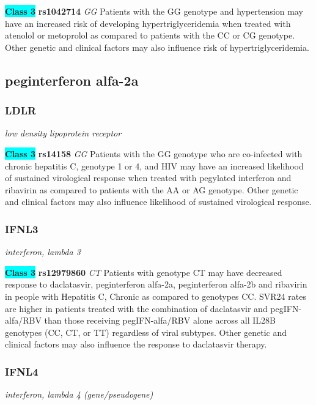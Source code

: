 \documentclass{report}
\begin{document}
\textbf{\colorbox{cyan} {Class 3}} \textbf{ rs1042714 } \textit{ GG }
Patients with the GG genotype and hypertension may have an increased risk of developing hypertriglyceridemia when treated with atenolol or metoprolol as compared to patients with the CC or CG genotype. Other genetic and clinical factors may also influence risk of hypertriglyceridemia. \newline\subsection{ peginterferon alfa-2a }\subsubsection{ LDLR }
\textit{ low density lipoprotein receptor }

\textbf{\colorbox{cyan} {Class 3}} \textbf{ rs14158 } \textit{ GG }
Patients with the GG genotype who are co-infected with chronic hepatitis C, genotype 1 or 4, and HIV may have an increased likelihood of sustained virological response when treated with pegylated interferon and ribavirin as compared to patients with the AA or AG genotype. Other genetic and clinical factors may also influence likelihood of sustained virological response. \newline\subsubsection{ IFNL3 }
\textit{ interferon, lambda 3 }

\textbf{\colorbox{cyan} {Class 3}} \textbf{ rs12979860 } \textit{ CT }
Patients with genotype CT may have decreased response to daclatasvir, peginterferon alfa-2a, peginterferon alfa-2b and ribavirin in people with Hepatitis C, Chronic as compared to genotypes CC. SVR24 rates are higher in patients treated with the combination of daclatasvir and pegIFN-alfa/RBV than those receiving pegIFN-alfa/RBV alone across all IL28B genotypes (CC, CT, or TT) regardless of viral subtypes. Other genetic and clinical factors may also influence the response to daclatasvir therapy.\newline\subsubsection{ IFNL4 }
\textit{ interferon, lambda 4 (gene/pseudogene) }
\end{document}
